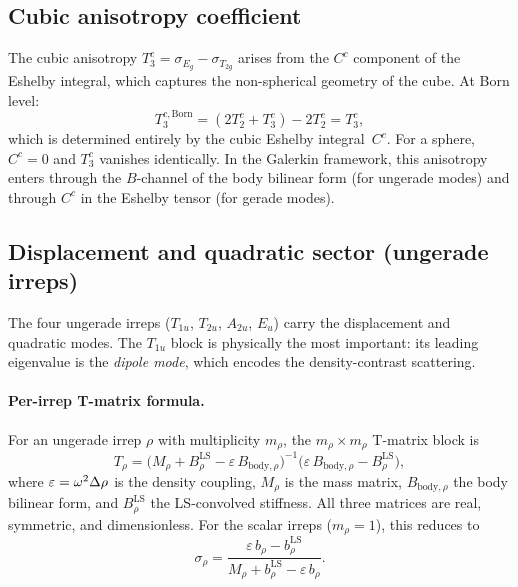 \subsection{Cubic anisotropy coefficient}

The cubic anisotropy $T_3^c = \sigma_{E_g} - \sigma_{T_{2g}}$ arises
from the $C^c$ component of the Eshelby integral, which captures the
non-spherical geometry of the cube.  At Born level:
\begin{equation}
  T_3^{c,\text{Born}}
  = (2T_2^c + T_3^c) - 2T_2^c
  = T_3^c,
\end{equation}
which is determined entirely by the cubic Eshelby integral~$C^c$.
For a sphere, $C^c = 0$ and $T_3^c$ vanishes identically.
In the Galerkin framework, this anisotropy enters through the
$B$-channel of the body bilinear form (for ungerade modes) and
through $C^c$ in the Eshelby tensor (for gerade modes).

\subsection{Displacement and quadratic sector (ungerade irreps)}
\label{sec:ungerade-sector}

The four ungerade irreps ($T_{1u}$, $T_{2u}$, $A_{2u}$, $E_u$) carry
the displacement and quadratic modes.  The $T_{1u}$ block is physically
the most important: its leading eigenvalue is the \emph{dipole mode},
which encodes the density-contrast scattering.

\paragraph{Per-irrep T-matrix formula.}
For an ungerade irrep $\rho$ with multiplicity $m_\rho$, the
$m_\rho \times m_\rho$ T-matrix block is
\begin{equation}
  T_\rho
  = \big(M_\rho + B^{\text{LS}}_\rho - \varepsilon\,B_{\text{body},\rho}\big)^{-1}
    \big(\varepsilon\,B_{\text{body},\rho} - B^{\text{LS}}_\rho\big),
  \label{eq:ungerade-T}
\end{equation}
where $\varepsilon = \omega^2 \Delta\rho$ is the density coupling,
$M_\rho$ is the mass matrix, $B_{\text{body},\rho}$ the body bilinear
form, and $B^{\text{LS}}_\rho$ the LS-convolved stiffness.  All three
matrices are real, symmetric, and dimensionless.  For the scalar
irreps ($m_\rho = 1$), this reduces to
\begin{equation}
  \sigma_\rho
  = \frac{\varepsilon\,b_\rho - b^{\text{LS}}_\rho}
         {M_\rho + b^{\text{LS}}_\rho - \varepsilon\,b_\rho}.
\end{equation}

